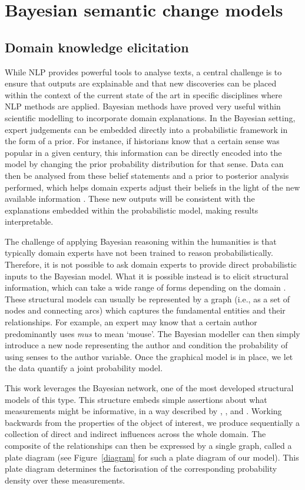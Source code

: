 \documentclass[output=paper]{langscibook}
\begin{document}
\section{Bayesian semantic change models}

\subsection{Domain knowledge elicitation}\label{sec:elicitation}
While NLP provides powerful tools to analyse texts, a central challenge is to ensure that outputs are explainable and that new discoveries can be placed within the context of the current state of the art in specific disciplines where NLP methods are applied. Bayesian methods have proved very useful within scientific modelling to incorporate domain explanations. In the Bayesian setting, expert judgements can be embedded directly into a probabilistic framework in the form of a prior. For instance, if historians know that a certain sense was popular in a given century, this information can be directly encoded into the model by changing the prior probability distribution for that sense. Data can then be analysed from these belief statements and a prior to posterior analysis performed, which helps domain experts adjust their beliefs in the light of the new available information \citep[see for example][]{smith2010, hagan2014}. These new outputs will be consistent with the explanations embedded within the probabilistic model, making results interpretable.

The challenge of applying Bayesian reasoning within the humanities is that typically domain experts have not been trained to reason probabilistically. Therefore, it is not possible to ask domain experts to provide direct probabilistic inputs to the Bayesian model. What it is possible instead is to elicit structural information, which can take a wide range of forms depending on the domain \citep{wilk2019}. These structural models can usually be represented by a graph (i.e., as a set of nodes and connecting arcs) which captures the fundamental entities and their relationships. For example, an expert may know that a certain author predominantly uses \emph{mus} to mean `mouse'. The Bayesian modeller can then simply introduce a new node representing the author and condition the probability of using senses to the author variable. Once the graphical model is in place, we let the data quantify a joint probability model. 

This work leverages the Bayesian network, one of the most developed structural models of this type. This structure embeds simple assertions about what measurements might be informative, in a way described by \citet{korb2009}, \citet{smith2010}, and \citet{pearl2014}. Working backwards from the properties of the object of interest, we produce sequentially a collection of direct and indirect influences across the whole domain. The composite of the relationships can then be expressed by a single graph, called a plate diagram (see Figure~\ref{diagram} for such a plate diagram of our model). This plate diagram determines the factorisation of the corresponding probability density over these measurements.
\end{document}
